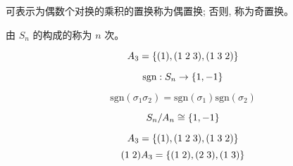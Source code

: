 \begin{frame}{}
  \begin{definition}
    可表示为偶数个对换的乘积的置换称为偶置换; 否则, 称为奇置换。
  \end{definition}

  \pause
  \vspace{0.80cm}
  \begin{definition}
    由 $S_{n}$ 的构成的称为 $n$ 次。
  \end{definition}

  \pause
  \[
    A_{3} = \{(1), (1\;2\;3), (1\;3\;2)\}
  \]
\end{frame}

\begin{frame}{}
  \[
    \text{sgn}: S_{n} \to \{1, -1\}
  \]

  \pause
  \[
    \text{sgn}(\sigma_{1}\sigma_{2}) = \text{sgn}(\sigma_{1})\text{sgn}(\sigma_{2})
  \]

  \pause
  \[
    S_{n}/A_{n} \cong \{1, -1\}
  \]
\end{frame}

\begin{frame}{}

  \[
    A_{3} = \{(1), (1\;2\;3), (1\;3\;2)\}
  \]
  \[
    (1\;2) A_{3} = \{(1\;2), (2\;3), (1\;3)\}
  \]
\end{frame}
